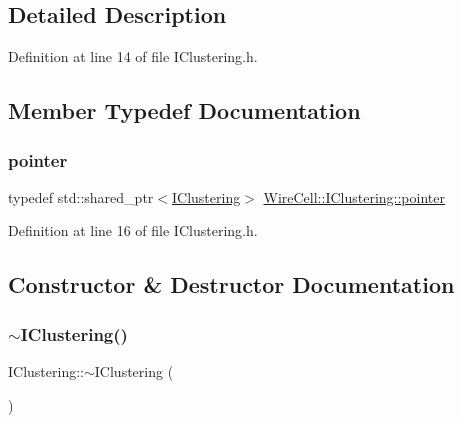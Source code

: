 \subsection{Detailed Description}


Definition at line 14 of file I\+Clustering.\+h.



\subsection{Member Typedef Documentation}
\mbox{\label{class_wire_cell_1_1_i_clustering_a5e81dc78c5923fd10952ff7756f11e3a}} 
\subsubsection{\texorpdfstring{pointer}{pointer}}
{\footnotesize\ttfamily typedef std\+::shared\+\_\+ptr$<$\hyperlink{class_wire_cell_1_1_i_clustering}{I\+Clustering}$>$ \hyperlink{class_wire_cell_1_1_i_clustering_a5e81dc78c5923fd10952ff7756f11e3a}{Wire\+Cell\+::\+I\+Clustering\+::pointer}}



Definition at line 16 of file I\+Clustering.\+h.



\subsection{Constructor \& Destructor Documentation}
\mbox{\label{class_wire_cell_1_1_i_clustering_a4a4cb8d47c7545352d052ba5c759373e}} 
\subsubsection{\texorpdfstring{$\sim$\+I\+Clustering()}{~IClustering()}}
{\footnotesize\ttfamily I\+Clustering\+::$\sim$\+I\+Clustering (\begin{DoxyParamCaption}{ }\end{DoxyParamCaption})\hspace{0.3cm}{\ttfamily [virtual]}}



